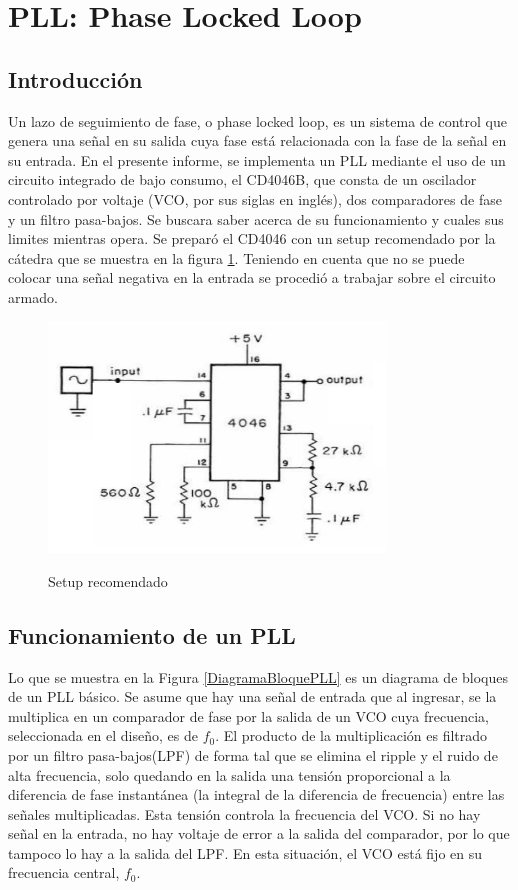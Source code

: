 \section{PLL: Phase Locked Loop}

\subsection{Introducción}

Un lazo de seguimiento de fase, o phase locked loop, es un sistema de control que genera una señal en su salida cuya fase está relacionada con la fase de la señal en su entrada. En el presente informe, se implementa un PLL mediante el uso de un circuito integrado de bajo consumo, el CD4046B, que consta de un oscilador controlado por voltaje (VCO, por sus siglas en inglés), dos comparadores de fase y un filtro pasa-bajos. Se buscara saber acerca de su funcionamiento y cuales sus limites mientras opera. 
Se preparó el CD4046 con un setup recomendado por la cátedra que se muestra en la figura \ref{fig:Circuito PLL}. Teniendo en cuenta que no se puede colocar una señal negativa en la entrada se procedió a trabajar sobre el circuito armado.

\begin{figure}[H]
	\centering
	\includegraphics[width= 0.8\textwidth]{../1. PLL/Imagenes/Circuito PLL.png} 
	\label{fig:Circuito PLL}
	\caption{Setup recomendado}
\end{figure}

\subsection{Funcionamiento de un PLL}

Lo que se muestra en la Figura \ref{DiagramaBloquePLL} es un diagrama de bloques de un PLL básico. Se asume que hay una señal de entrada que al ingresar, se la multiplica en un comparador de fase por la salida de un VCO cuya frecuencia, seleccionada en el diseño, es de $f_0$. El producto de la multiplicación es filtrado por un filtro pasa-bajos(LPF) de forma tal que se elimina el ripple y el ruido de alta frecuencia, solo quedando en la salida una tensión proporcional a la diferencia de fase instantánea (la integral de la diferencia de frecuencia) entre las señales multiplicadas. Esta tensión controla la frecuencia del VCO. Si no hay señal en la entrada, no hay voltaje de error a la salida del comparador, por lo que tampoco lo hay a la salida del LPF. En esta situación, el VCO está fijo en su frecuencia central, $f_0$.


